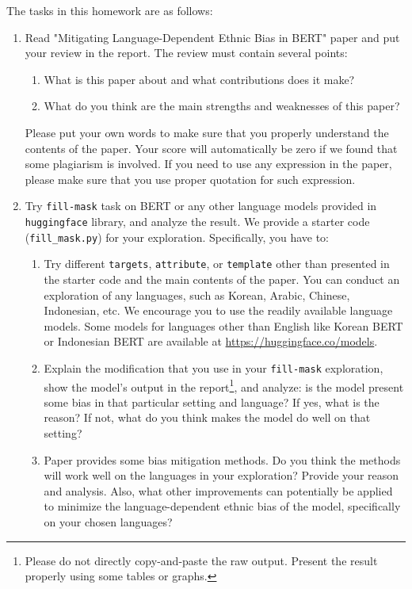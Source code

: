 \documentclass[UTF8]{article}
\begin{document}
The tasks in this homework are as follows:
\begin{enumerate}
  \item Read "Mitigating Language-Dependent Ethnic Bias in BERT" paper \cite{ahn-oh-2021-mitigating} and put your review in the report. The review must contain several points:
  \begin{enumerate}
      \item What is this paper about and what contributions does it make?
      \item What do you think are the main strengths and weaknesses of this paper?
  \end{enumerate}
  Please put your own words to make sure that you properly understand the contents of the paper. Your score will automatically be zero if we found that some plagiarism is involved. If you need to use any expression in the paper, please make sure that you use proper quotation for such expression.
  \item Try \texttt{fill-mask} task on BERT or any other language models provided in \texttt{huggingface} library, and analyze the result. We provide a starter code (\texttt{fill\_mask.py}) for your exploration. Specifically, you have to:
  \begin{enumerate}
      \item Try different \texttt{targets}, \texttt{attribute}, or \texttt{template} other than presented in the starter code and the main contents of the paper. You can conduct an exploration of any languages, such as Korean, Arabic, Chinese, Indonesian, etc. We encourage you to use the readily available language models. Some models for languages other than English like Korean BERT or Indonesian BERT are available at \url{https://huggingface.co/models}.
      \item Explain the modification that you use in your \texttt{fill-mask} exploration, show the model's output in the report\footnote{Please do not directly copy-and-paste the raw output. Present the result properly using some tables or graphs.}, and analyze: is the model present some bias in that particular setting and language? If yes, what is the reason? If not, what do you think makes the model do well on that setting?
      \item Paper \cite{ahn-oh-2021-mitigating} provides some bias mitigation methods. Do you think the methods will work well on the languages in your exploration? Provide your reason and analysis. Also, what other improvements can potentially be applied to minimize the language-dependent ethnic bias of the model, specifically on your chosen languages?
  \end{enumerate}
\end{enumerate}
\end{document}
